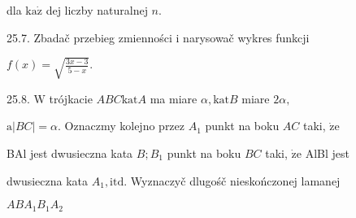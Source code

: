 \documentclass[a4paper,12pt]{article}
\begin{document}
dla $\mathrm{k}\mathrm{a}\dot{\mathrm{z}}$ dej liczby naturalnej $n.$

25.7. Zbadač przebieg zmienności $\mathrm{i}$ narysowač wykres funkcji

$f(x)=\sqrt{\frac{3x-3}{5-x}}.$

25.8. $\mathrm{W}$ trójkacie $ABC \mathrm{k}\mathrm{a}\mathrm{t} A$ ma miare $\alpha, \mathrm{k}\mathrm{a}\mathrm{t} B$ miare $2\alpha,$

$\mathrm{a}|BC|=\alpha$. Oznaczmy kolejno przez $A_{1}$ punkt na boku $AC$ taki, $\dot{\mathrm{z}}\mathrm{e}$

BAl jest dwusieczna kata $B;B_{1}$ punkt na boku $BC$ taki, $\dot{\mathrm{z}}\mathrm{e}$ AlBl jest

dwusieczna kata $A_{1}, \mathrm{i}\mathrm{t}\mathrm{d}$. Wyznaczyč dlugośč nieskończonej lamanej

$ABA_{1}B_{1}A_{2}$
\end{document}

